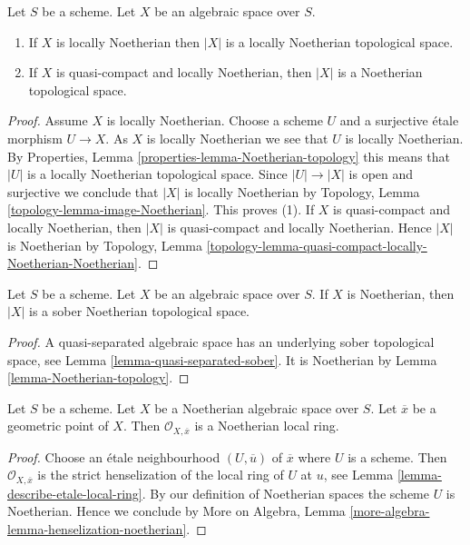 \begin{lemma}
\label{lemma-Noetherian-topology}
Let $S$ be a scheme. Let $X$ be an algebraic space over $S$.
\begin{enumerate}
\item If $X$ is locally Noetherian then $|X|$ is a locally Noetherian
topological space.
\item If $X$ is quasi-compact and locally Noetherian, then $|X|$
is a Noetherian topological space.
\end{enumerate}
\end{lemma}

\begin{proof}
Assume $X$ is locally Noetherian.
Choose a scheme $U$ and a surjective \'etale morphism
$U \to X$. As $X$ is locally Noetherian we see that $U$ is locally
Noetherian. By
Properties, Lemma \ref{properties-lemma-Noetherian-topology}
this means that $|U|$ is a locally Noetherian topological space.
Since $|U| \to |X|$ is open and surjective we conclude that
$|X|$ is locally Noetherian by
Topology, Lemma \ref{topology-lemma-image-Noetherian}.
This proves (1). If $X$ is quasi-compact and locally Noetherian,
then $|X|$ is quasi-compact and locally Noetherian. Hence $|X|$
is Noetherian by
Topology,
Lemma \ref{topology-lemma-quasi-compact-locally-Noetherian-Noetherian}.
\end{proof}

\begin{lemma}
\label{lemma-Noetherian-sober}
Let $S$ be a scheme. Let $X$ be an algebraic space over $S$.
If $X$ is Noetherian, then $|X|$ is a sober Noetherian topological space.
\end{lemma}

\begin{proof}
A quasi-separated algebraic space has an underlying sober topological
space, see
Lemma \ref{lemma-quasi-separated-sober}.
It is Noetherian by
Lemma \ref{lemma-Noetherian-topology}.
\end{proof}

\begin{lemma}
\label{lemma-Noetherian-local-ring-Noetherian}
Let $S$ be a scheme. Let $X$ be a Noetherian algebraic space over $S$.
Let $\overline{x}$ be a geometric point of $X$. Then
$\mathcal{O}_{X, \overline{x}}$ is a Noetherian local ring.
\end{lemma}

\begin{proof}
Choose an \'etale neighbourhood $(U, \overline{u})$ of $\overline{x}$
where $U$ is a scheme. Then $\mathcal{O}_{X, \overline{x}}$ is the
strict henselization of the local ring of $U$ at $u$, see
Lemma \ref{lemma-describe-etale-local-ring}.
By our definition of Noetherian spaces the scheme $U$ is Noetherian.
Hence we conclude by
More on Algebra, Lemma \ref{more-algebra-lemma-henselization-noetherian}.
\end{proof}








